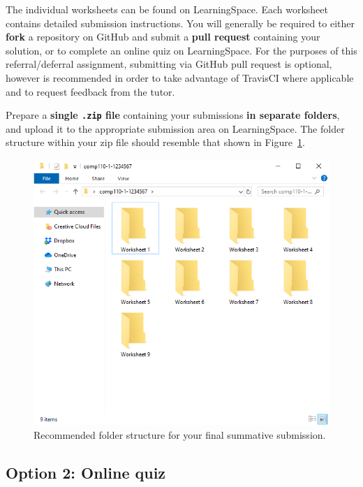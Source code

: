 \documentclass{../../fal_assignment}
\begin{document}
The individual worksheets can be found on LearningSpace.
Each worksheet contains detailed submission instructions. You will generally be required to either \textbf{fork} a repository on GitHub and submit a \textbf{pull request} containing your solution, or to complete an online quiz on LearningSpace.
For the purposes of this referral/deferral assignment, submitting via GitHub pull request is optional,
however is recommended in order to take advantage of TravisCI where applicable and to request feedback from the tutor.

Prepare a \textbf{single \texttt{.zip} file} containing your submissions \textbf{in separate folders}, and upload it to the appropriate submission area on LearningSpace. The folder structure within your zip file should resemble that shown in Figure~\ref{fig:folder_structure}.
\begin{figure}
    \begin{center}
        \includegraphics[height=0.4\textheight]{folder_structure}
    \end{center}
    \caption{Recommended folder structure for your final summative submission.}
    \label{fig:folder_structure}
\end{figure}

\subsection*{Option 2: Online quiz}
\end{document}

